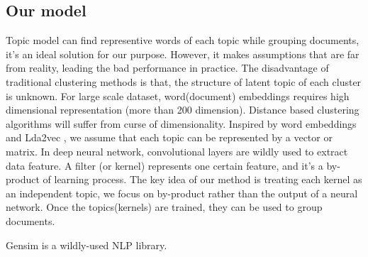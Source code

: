 \subsection{Our model}
\label{sec:modeling}
Topic model can find representive words of each topic while grouping documents, it's an ideal solution for our purpose. However, it makes assumptions that are far from reality, leading the bad performance in practice. The disadvantage of traditional clustering methods is that, the structure of latent topic of each cluster is unknown. For large scale dataset, word(document) embeddings requires high dimensional representation (more than 200 dimension). Distance based clustering algorithms will suffer from curse of dimensionality. Inspired by word embeddings and Lda2vec \cite{moody2016mixing}, we assume that each topic can be represented by a vector or matrix. In deep neural network, convolutional layers are wildly used to extract data feature. A filter (or kernel) represents one certain feature, and it's a by-product of learning process. The key idea of our method is treating each kernel as an independent topic, we focus on by-product rather than the output of a neural network. Once the topics(kernels) are trained, they can be used to group documents.

Gensim \cite{rehurek_lrec} is a wildly-used NLP library.